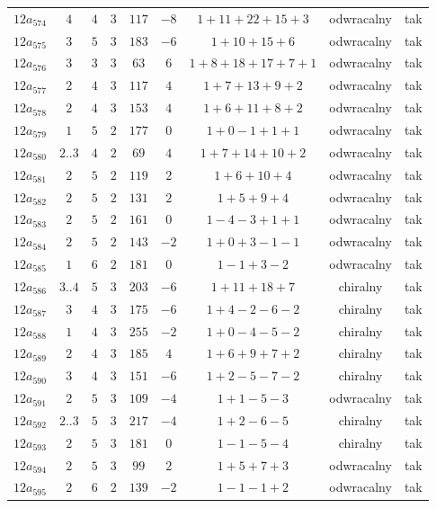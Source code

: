 \begin{longtable}{ccccccccc}
$12a_{574}$ & $4$ & $4$ & $3$ & $117$ & $-8$ & $1+11+22+15+3$ & odwracalny & tak \\
$12a_{575}$ & $3$ & $5$ & $3$ & $183$ & $-6$ & $1+10+15+6$ & odwracalny & tak \\
$12a_{576}$ & $3$ & $3$ & $3$ & $63$ & $6$ & $1+8+18+17+7+1$ & odwracalny & tak \\
$12a_{577}$ & $2$ & $4$ & $3$ & $117$ & $4$ & $1+7+13+9+2$ & odwracalny & tak \\
$12a_{578}$ & $2$ & $4$ & $3$ & $153$ & $4$ & $1+6+11+8+2$ & odwracalny & tak \\
$12a_{579}$ & $1$ & $5$ & $2$ & $177$ & $0$ & $1+0-1+1+1$ & odwracalny & tak \\
$12a_{580}$ & $2..3$ & $4$ & $2$ & $69$ & $4$ & $1+7+14+10+2$ & odwracalny & tak \\
$12a_{581}$ & $2$ & $5$ & $2$ & $119$ & $2$ & $1+6+10+4$ & odwracalny & tak \\
$12a_{582}$ & $2$ & $5$ & $2$ & $131$ & $2$ & $1+5+9+4$ & odwracalny & tak \\
$12a_{583}$ & $2$ & $5$ & $2$ & $161$ & $0$ & $1-4-3+1+1$ & odwracalny & tak \\
$12a_{584}$ & $2$ & $5$ & $2$ & $143$ & $-2$ & $1+0+3-1-1$ & odwracalny & tak \\
$12a_{585}$ & $1$ & $6$ & $2$ & $181$ & $0$ & $1-1+3-2$ & odwracalny & tak \\
$12a_{586}$ & $3..4$ & $5$ & $3$ & $203$ & $-6$ & $1+11+18+7$ & chiralny & tak \\
$12a_{587}$ & $3$ & $4$ & $3$ & $175$ & $-6$ & $1+4-2-6-2$ & chiralny & tak \\
$12a_{588}$ & $1$ & $4$ & $3$ & $255$ & $-2$ & $1+0-4-5-2$ & chiralny & tak \\
$12a_{589}$ & $2$ & $4$ & $3$ & $185$ & $4$ & $1+6+9+7+2$ & chiralny & tak \\
$12a_{590}$ & $3$ & $4$ & $3$ & $151$ & $-6$ & $1+2-5-7-2$ & chiralny & tak \\
$12a_{591}$ & $2$ & $5$ & $3$ & $109$ & $-4$ & $1+1-5-3$ & odwracalny & tak \\
$12a_{592}$ & $2..3$ & $5$ & $3$ & $217$ & $-4$ & $1+2-6-5$ & chiralny & tak \\
$12a_{593}$ & $2$ & $5$ & $3$ & $181$ & $0$ & $1-1-5-4$ & chiralny & tak \\
$12a_{594}$ & $2$ & $5$ & $3$ & $99$ & $2$ & $1+5+7+3$ & odwracalny & tak \\
$12a_{595}$ & $2$ & $6$ & $2$ & $139$ & $-2$ & $1-1-1+2$ & odwracalny & tak \\

\end{longtable}
